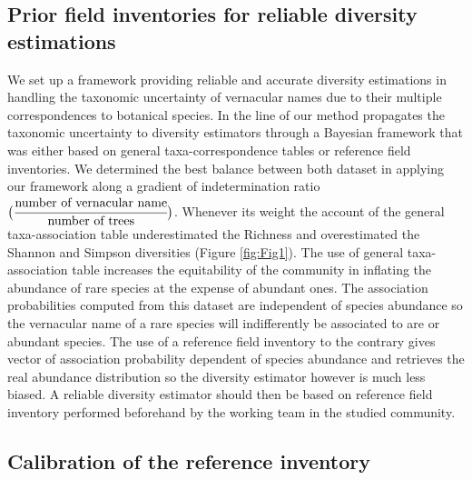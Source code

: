 \documentclass[fleqn,10pt]{ArtEcoFoG} %
\begin{document}
\subsection{Prior field inventories for reliable diversity
estimations}\label{prior-field-inventories-for-reliable-diversity-estimations}

We set up a framework providing reliable and accurate diversity
estimations in handling the taxonomic uncertainty of vernacular names
due to their multiple correspondences to botanical species. In the line
of \citet{Guitet2014b} our method propagates the taxonomic uncertainty
to diversity estimators through a Bayesian framework that was either
based on general taxa-correspondence tables or reference field
inventories. We determined the best balance between both dataset in
applying our framework along a gradient of indetermination ratio
\(\big(\cfrac{\text{number of vernacular name}}{\text{number of trees}}\big)\).
Whenever its weight the account of the general taxa-association table
underestimated the Richness and overestimated the Shannon and Simpson
diversities (Figure \ref{fig:Fig1}). The use of general taxa-association
table increases the equitability of the community in inflating the
abundance of rare species at the expense of abundant ones. The
association probabilities computed from this dataset are independent of
species abundance so the vernacular name of a rare species will
indifferently be associated to are or abundant species. The use of a
reference field inventory to the contrary gives vector of association
probability dependent of species abundance and retrieves the real
abundance distribution so the diversity estimator however is much less
biased. A reliable diversity estimator should then be based on reference
field inventory performed beforehand by the working team in the studied
community.

\subsection{Calibration of the reference
inventory}\label{calibration-of-the-reference-inventory}
\end{document}
